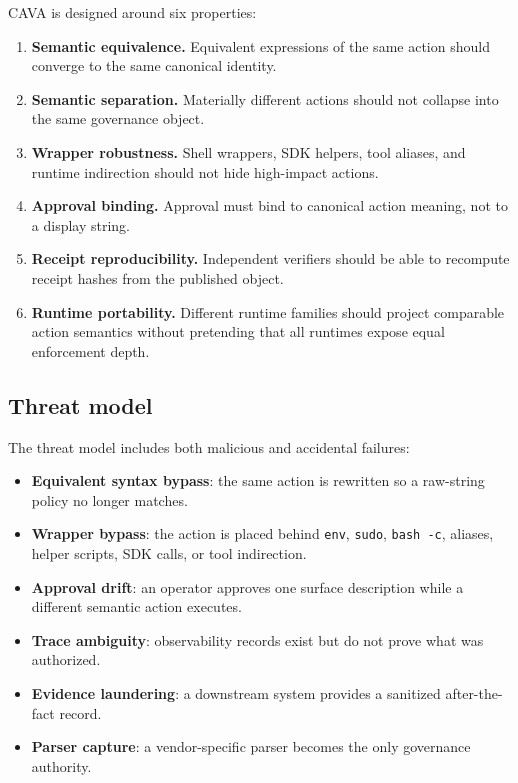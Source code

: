 \documentclass[11pt]{article}
\begin{document}
CAVA is designed around six properties:
\begin{enumerate}
  \item \textbf{Semantic equivalence.} Equivalent expressions of the same action should converge to the same canonical identity.
  \item \textbf{Semantic separation.} Materially different actions should not collapse into the same governance object.
  \item \textbf{Wrapper robustness.} Shell wrappers, SDK helpers, tool aliases, and runtime indirection should not hide high-impact actions.
  \item \textbf{Approval binding.} Approval must bind to canonical action meaning, not to a display string.
  \item \textbf{Receipt reproducibility.} Independent verifiers should be able to recompute receipt hashes from the published object.
  \item \textbf{Runtime portability.} Different runtime families should project comparable action semantics without pretending that all runtimes expose equal enforcement depth.
\end{enumerate}

\subsection{Threat model}

The threat model includes both malicious and accidental failures:
\begin{itemize}
  \item \textbf{Equivalent syntax bypass}: the same action is rewritten so a raw-string policy no longer matches.
  \item \textbf{Wrapper bypass}: the action is placed behind \texttt{env}, \texttt{sudo}, \texttt{bash -c}, aliases, helper scripts, SDK calls, or tool indirection.
  \item \textbf{Approval drift}: an operator approves one surface description while a different semantic action executes.
  \item \textbf{Trace ambiguity}: observability records exist but do not prove what was authorized.
  \item \textbf{Evidence laundering}: a downstream system provides a sanitized after-the-fact record.
  \item \textbf{Parser capture}: a vendor-specific parser becomes the only governance authority.
\end{itemize}
\end{document}
